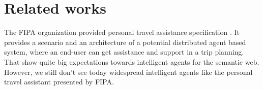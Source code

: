 \documentclass{llncs}
\begin{document}

\section{Related works}

The \gls{FIPA} organization provided personal travel assistance specification \cite{fipa000132000fipa}. It provides a scenario and an architecture of a potential distributed agent based system, where an end-user can get assistance and support in a trip planning. That show quite big expectations towards intelligent agents for the semantic web. However, we still don't see today widespread intelligent agents like the personal travel assistant presented by \gls{FIPA}.
\end{document}
